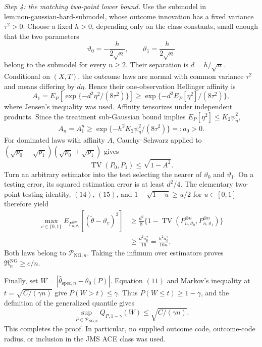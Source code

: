 \emph{Step 4: the matching two-point lower bound.}
Use the submodel in \(\text{lem:non-gaussian-hard-submodel}\), whose outcome innovation has a fixed variance \(\tau^2>0\).  Choose a fixed \(h>0\), depending only on the class constants, small enough that the two parameters
\[
 \vartheta_0=-\frac{h}{2\sqrt n},
 \qquad
 \vartheta_1=\frac{h}{2\sqrt n}
\]
belong to the submodel for every \(n\ge2\).  Their separation is \(d=h/\sqrt n\).  Conditional on \((X,T)\), the outcome laws are normal with common variance \(\tau^2\) and means differing by \(d\eta\).  Hence their one-observation Hellinger affinity is
\[
 A_1=E_P\!\left[\exp\{-d^2\eta^2/(8\tau^2)\}\right]
 \ge \exp\{-d^2E_P[\eta^2]/(8\tau^2)\}, \tag{13}
\]
where Jensen's inequality was used.  Affinity tensorizes under independent products.  Since the treatment sub-Gaussian bound implies \(E_P[\eta^2]\le K_2\psi_{\eta}^2\),
\[
 A_n=A_1^n
 \ge \exp\{-h^2K_2\psi_{\eta}^2/(8\tau^2)\}
 =:a_0>0. \tag{14}
\]
For dominated laws with affinity \(A\), Cauchy--Schwarz applied to \((\sqrt{p_0}-\sqrt{p_1})(\sqrt{p_0}+\sqrt{p_1})\) gives
\[
 \operatorname{TV}(P_0,P_1)\le\sqrt{1-A^2}. \tag{15}
\]
Turn an arbitrary estimator into the test selecting the nearer of \(\vartheta_0\) and \(\vartheta_1\).  On a testing error, its squared estimation error is at least \(d^2/4\).  The elementary two-point testing identity, \((14)\), \((15)\), and \(1-\sqrt{1-u}\ge u/2\) for \(u\in[0,1]\) therefore yield
\[
 \begin{aligned}
 \max_{v\in\{0,1\}}
 E_{P_{n,\vartheta_v}^{\otimes n}}
 [ (\widetilde\theta-\vartheta_v)^2]
 &\ge \frac{d^2}{8}
 \{1-\operatorname{TV}(P_{n,\vartheta_0}^{\otimes n},
                       P_{n,\vartheta_1}^{\otimes n})\}\\
 &\ge \frac{d^2a_0^2}{16}
 =\frac{h^2a_0^2}{16n}. \tag{16}
 \end{aligned}
\]
Both laws belong to \(\mathcal P_{\mathrm{NG},n}\).  Taking the infimum over estimators proves \(\mathfrak R_n^{\mathrm{NG}}\ge c/n\).

Finally, set \(W=|\widehat\theta_{\mathrm{spec},n}-\theta_0(P)|\).  Equation \((11)\) and Markov's inequality at \(t=\sqrt{C/(\gamma n)}\) give \(P(W>t)\le\gamma\).  Thus \(P(W\le t)\ge1-\gamma\), and the definition of the generalized quantile gives
\[
 \sup_{P\in\mathcal P_{\mathrm{NG},n}}
 Q_{P,1-\gamma}(W)
 \le\sqrt{C/(\gamma n)}.
\]
This completes the proof.  In particular, no supplied outcome code, outcome-code radius, or inclusion in the JMS ACE class was used.